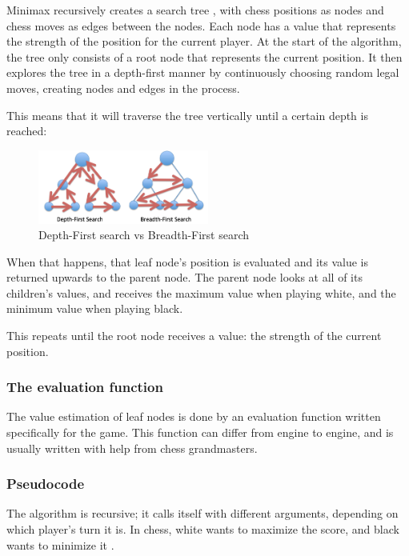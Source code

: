 \documentclass{article}
\begin{document}
Minimax recursively creates a search tree \cite{eppesHowComputerizedChess2019}, with chess positions as nodes and chess moves as edges between the nodes. 
Each node has a value that represents the strength of the position for the current player. 
At the start of the algorithm, the tree only consists of a root node that represents the current position. 
It then explores the tree in a depth-first manner by continuously choosing random legal moves, creating nodes and edges in the process.

This means that it will traverse the tree vertically until a certain depth is reached:

\begin{figure}[H]
    \centering
    \includegraphics[width=0.5\textwidth]{img/depth-vs-breadth.png}
    \caption{Depth-First search vs Breadth-First search \cite{eppesHowComputerizedChess2019}}
\end{figure}

When that happens, that leaf node's position is evaluated and its value is returned
upwards to the parent node. The parent node looks at all of its children's values, 
and receives the maximum value when playing white, and the minimum value
when playing black. 

This repeats until the root node receives a value: the strength of the current position.

\subsubsection{The evaluation function}

The value estimation of leaf nodes is done by an evaluation function \cite{EvaluationFunction2022} written specifically
for the game. This function can differ from engine to engine, and is usually written with 
help from chess grandmasters. 



\subsubsection{Pseudocode}

The algorithm is recursive; it calls itself with different arguments, depending
on which player's turn it is. In chess, white wants to maximize the score, and 
black wants to minimize it \cite{Minimax2022}. 
\end{document}

